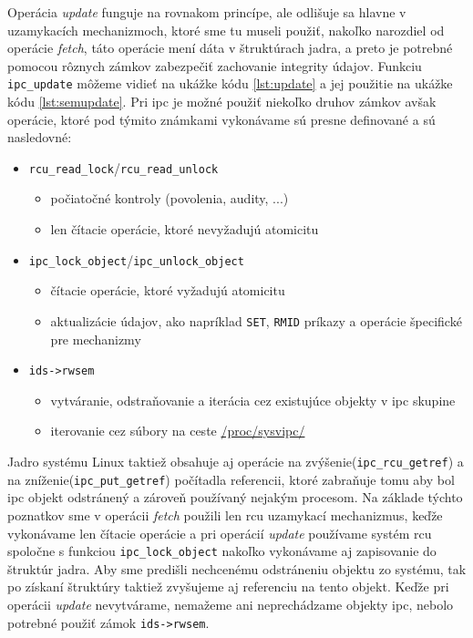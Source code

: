 Operácia \textit{update} funguje na rovnakom princípe, ale odlišuje sa hlavne v uzamykacích mechanizmoch, ktoré sme tu museli použiť, nakoľko narozdiel od operácie \textit{fetch}, táto operácie mení dáta v štruktúrach jadra, a preto je potrebné pomocou rôznych zámkov zabezpečiť zachovanie integrity údajov. Funkciu \texttt{ipc\_update} môžeme vidieť na ukážke kódu \ref{lst:update} a jej použitie na ukážke kódu \ref{lst:semupdate}. Pri \acrshort{ipc} je možné použiť niekoľko druhov zámkov avšak operácie, ktoré pod týmito známkami vykonávame sú presne definované a sú nasledovné:
\begin{itemize}
\item \texttt{rcu\_read\_lock}/\texttt{rcu\_read\_unlock}
\begin{itemize}
\item počiatočné kontroly (povolenia, audity, ...)
\item len čítacie operácie, ktoré nevyžadujú atomicitu 
\end{itemize}
\item \texttt{ipc\_lock\_object}/\texttt{ipc\_unlock\_object}
\begin{itemize}
\item čítacie operácie, ktoré vyžadujú atomicitu 
\item aktualizácie údajov, ako napríklad \texttt{SET}, \texttt{RMID} príkazy a operácie špecifické pre mechanizmy
\end{itemize}
\item \texttt{ids->rwsem}
\begin{itemize}
\item vytváranie, odstraňovanie a iterácia cez existujúce objekty v \acrshort{ipc} skupine
\item iterovanie cez súbory na ceste \url{/proc/sysvipc/}
\end{itemize}
\end{itemize}
Jadro systému Linux taktiež obsahuje aj operácie na zvýšenie(\texttt{ipc\_rcu\_getref}) a na zníženie(\texttt{ipc\_put\_getref}) počítadla referencii, ktoré zabraňuje tomu aby bol \acrshort{ipc} objekt odstránený a zároveň používaný nejakým procesom. Na základe týchto poznatkov sme v operácii \textit{fetch} použili len \acrshort{rcu} uzamykací mechanizmus, keďže vykonávame len čítacie operácie a pri operácií \textit{update} používame systém \acrshort{rcu} spoločne s funkciou \texttt{ipc\_lock\_object} nakoľko vykonávame aj zapisovanie do štruktúr jadra. Aby sme predišli nechcenému odstráneniu objektu zo systému, tak po získaní štruktúry taktiež zvyšujeme aj referenciu na tento objekt. Keďže pri operácii \textit{update} nevytvárame, nemažeme ani neprechádzame objekty \acrshort{ipc}, nebolo potrebné použiť zámok \texttt{ids->rwsem}.
